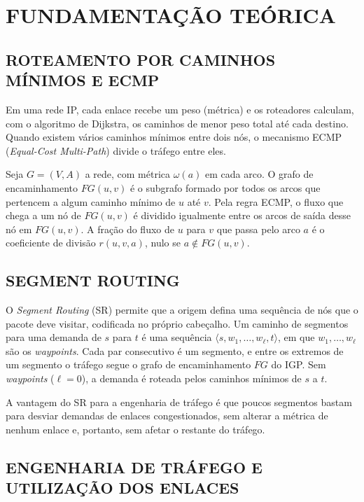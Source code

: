 \chapter{FUNDAMENTAÇÃO TEÓRICA}
\label{cap:fundamentacao}

\section{\uppercase{Roteamento por Caminhos Mínimos e ECMP}}

Em uma rede IP, cada enlace recebe um peso (métrica) e os roteadores calculam, com o algoritmo de Dijkstra, os caminhos de menor peso total até cada destino. Quando existem vários caminhos mínimos entre dois nós, o mecanismo ECMP (\textit{Equal-Cost Multi-Path}) divide o tráfego entre eles.

Seja $G = (V, A)$ a rede, com métrica $\omega(a)$ em cada arco. O grafo de encaminhamento $FG(u, v)$ é o subgrafo formado por todos os arcos que pertencem a algum caminho mínimo de $u$ até $v$. Pela regra ECMP, o fluxo que chega a um nó de $FG(u, v)$ é dividido igualmente entre os arcos de saída desse nó em $FG(u, v)$. A fração do fluxo de $u$ para $v$ que passa pelo arco $a$ é o coeficiente de divisão $r(u, v, a)$, nulo se $a \notin FG(u, v)$.

\section{\uppercase{Segment Routing}}

O \textit{Segment Routing} (SR) permite que a origem defina uma sequência de nós que o pacote deve visitar, codificada no próprio cabeçalho. Um caminho de segmentos para uma demanda de $s$ para $t$ é uma sequência $\langle s, w_1, \dots, w_\ell, t \rangle$, em que $w_1, \dots, w_\ell$ são os \textit{waypoints}. Cada par consecutivo é um segmento, e entre os extremos de um segmento o tráfego segue o grafo de encaminhamento $FG$ do IGP. Sem \textit{waypoints} ($\ell = 0$), a demanda é roteada pelos caminhos mínimos de $s$ a $t$.

A vantagem do SR para a engenharia de tráfego é que poucos segmentos bastam para desviar demandas de enlaces congestionados, sem alterar a métrica de nenhum enlace e, portanto, sem afetar o restante do tráfego.

\section{\uppercase{Engenharia de Tráfego e Utilização dos Enlaces}}

